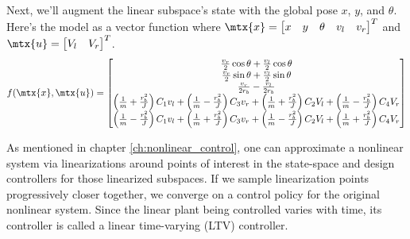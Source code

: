 Next, we'll augment the linear subspace's state with the global pose $x$, $y$,
and $\theta$. Here's the model as a vector function where
$\mtx{x} = \begin{bmatrix} x & y & \theta & v_l & v_r \end{bmatrix}^T$ and
$\mtx{u} = \begin{bmatrix} V_l & V_r \end{bmatrix}^T$.
\begin{equation}
  f(\mtx{x}, \mtx{u}) =
  \begin{bmatrix}
    \frac{v_r}{2}\cos\theta + \frac{v_l}{2}\cos\theta \\
    \frac{v_r}{2}\sin\theta + \frac{v_l}{2}\sin\theta \\
    \frac{v_r}{2r_b} - \frac{v_l}{2r_b} \\
    \left(\frac{1}{m} + \frac{r_b^2}{J}\right) C_1 v_l +
      \left(\frac{1}{m} - \frac{r_b^2}{J}\right) C_3 v_r +
      \left(\frac{1}{m} + \frac{r_b^2}{J}\right) C_2 V_l +
      \left(\frac{1}{m} - \frac{r_b^2}{J}\right) C_4 V_r \\
    \left(\frac{1}{m} - \frac{r_b^2}{J}\right) C_1 v_l +
      \left(\frac{1}{m} + \frac{r_b^2}{J}\right) C_3 v_r +
      \left(\frac{1}{m} - \frac{r_b^2}{J}\right) C_2 V_l +
      \left(\frac{1}{m} + \frac{r_b^2}{J}\right) C_4 V_r
  \end{bmatrix}
  \label{eq:ltv_diff_drive_f}
\end{equation}

As mentioned in chapter \ref{ch:nonlinear_control}, one can approximate a
nonlinear system via linearizations around points of interest in the state-space
and design controllers for those linearized subspaces. If we sample
linearization points progressively closer together, we converge on a control
policy for the original nonlinear system. Since the linear \gls{plant} being
controlled varies with time, its controller is called a linear time-varying
(LTV) controller.

